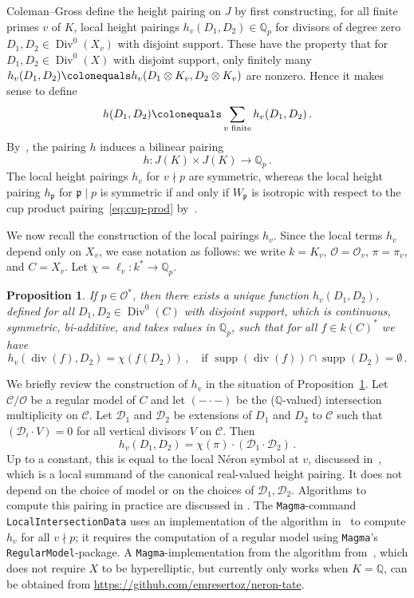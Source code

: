 \documentclass[11pt, a4paper]{amsart}
\newcommand{\Q}{\mathbb{Q}}
\newcommand{\calC}{\mathcal{C}}
\newcommand{\calD}{\mathcal{D}}
\renewcommand{\O}{\mathcal{O}}
\newcommand{\p}{\mathfrak{p}}
\newcommand{\Div}{\operatorname{Div}}
\newcommand{\dv}{\operatorname{div}}
\newcommand{\supp}{\operatorname{supp}}
\renewcommand{\O}{\mathcal{O}}
\newtheorem{proposition}[theorem]{Proposition}
\theoremstyle{remark}
\numberwithin{equation}{section}
\newcommand{\sm}{{}}
\begin{document}
Coleman--Gross define the  height pairing on $J$ by first constructing, for all finite primes $v$
of $K$, local height pairings
$h_v(D_1, D_2)\in\Q_p$ for divisors of degree zero $D_1,D_2\in \Div^0(X_v)$  with disjoint support. These have the property that for $D_1,D_2\in \Div^0(X)$ with disjoint support,
only finitely many $h_v(D_1, D_2)\colonequals h_v(D_1\otimes K_v, D_2\otimes K_v)$ are nonzero.
Hence it makes sense to define 
$$
h(D_1,D_2)\colonequals \sum_{v\sm{\text{ finite}}} 
 h_v(D_1,D_2)\,.
$$
By~\cite[Sections~1,~5]{Coleman-Gross-Heights}, 
the pairing $h$ induces a bilinear pairing
$$
h \colon J(K)\times J(K)\to \Q_p\,.
$$
The local height pairings $h_v$ for $v\nmid p$ are symmetric, whereas the local height pairing $h_{\p}$ for $\p\mid p$ is symmetric if and only if $W_\p$ is isotropic with respect to the cup product
pairing~\eqref{eq:cup-prod} by~\cite[Proposition 5.2]{Coleman-Gross-Heights}.

We  now recall the construction of the local pairings $h_v$.
Since the local terms $h_v$ depend only on $X_v$, we ease  notation as follows:
we write $k=K_v$, $\O = \O_v$, $\pi=\pi_v$, and $C=X_v$.
Let $\chi=\ell_v \colon k^{\ast}\longrightarrow\mathbb{Q}_p$.

\begin{proposition}{\cite[Proposition 1.2]{Coleman-Gross-Heights}}\label{P:htaway}
  If $p\in \O^\ast$, then there exists a unique function $h_v(D_1, D_2)$, defined for
all $D_1,D_2 \in \Div^0(C)$ with disjoint support, which is continuous, symmetric, bi-additive,
and takes values in $\mathbb{Q}_p$, such that for all $f\in k(C)^{\ast}$  we have
  $$h_v(\dv(f),D_2)=\chi(f(D_2))\,,\quad \text{if  }\supp(\dv(f))\cap
  \supp(D_2)=\emptyset\,.$$
\end{proposition} 
We briefly review the construction of $h_v$ in the situation of Proposition~\ref{P:htaway}.
Let $\calC/\O$ be a regular model of $C$ and let $(- \cdot-)$ be the ($\Q$-valued)
intersection multiplicity on $\calC$. Let $\calD_1$ and $\calD_2$ be extensions of
$D_1$ and $D_2$ to $\calC$ such that $(\calD_i\cdot V)=0$
for all vertical divisors $V$ on $\calC$. Then
\begin{equation*}\label{eq:intmult}
  h_v(D_1,D_2)=\chi(\pi)\cdot (\calD_1\cdot \calD_2)\,.
\end{equation*}
Up to a constant, this is equal to the local N\'eron symbol at $v$, discussed in~\cite[Sections~2,~3]{Gross-local-heights}, \sm{which is a local summand of the canonical real-valued height pairing}. It does not depend on the choice of model or on the choices of $\mathcal{D}_1,\mathcal{D}_2$.
\sm{Algorithms to compute this pairing in practice are discussed in  \cite{Hol12,
Mul14, Raymond-David-Steffen}. The {\tt Magma}-command {\tt LocalIntersectionData} uses an implementation of the algorithm in~\cite{Mul14} to compute $h_v$ for all $v\nmid p$; it requires the computation of a regular model using {\tt Magma}'s {\tt RegularModel}-package. A {\tt Magma}-implementation from the algorithm from~\cite{Raymond-David-Steffen}, which does not require $X$ to be hyperelliptic, but currently only works when $K=\Q$, can be obtained from {\url{https://github.com/emresertoz/neron-tate}}.}
\end{document}
